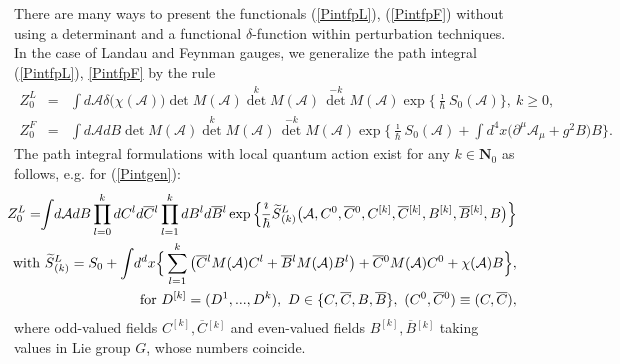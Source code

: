 \documentclass[10pt]{article}
\begin{document}
There are many ways to present the functionals  (\ref{PintfpL}), (\ref{PintfpF}) without using a determinant
and a functional $\delta$-function within perturbation techniques. In the case of Landau and Feynman gauges,
we generalize the path integral (\ref{PintfpL}), \ref{PintfpF}  by the rule
\begin{eqnarray}\label{Pintgen}
 Z^L_{0} & = & \int  d \mathcal{A} \delta\big(\chi(\mathcal{A})\big)\det M(\mathcal{A}) {\det}^{k} M(\mathcal{A}) \,  {\det}^{-k} M(\mathcal{A})\exp\Big\{\frac{\imath}{\hbar}S_0(\mathcal{A})\Big\} , \ k \geq 0,\\
 \label{PintgenF} Z^F_{0} & = &  \int  d \mathcal{A} d B \det M(\mathcal{A}) {\det}^{k} M(\mathcal{A}) \,  {\det}^{-k} M(\mathcal{A})\exp\Big\{\frac{\imath}{\hbar}S_0(\mathcal{A})+ \int d^4x  \big(\partial^\mu \mathcal{A}_\mu + {g^2}B\big)B\Big\}.
\end{eqnarray}
The path integral formulations with local quantum action exist for any $k \in \mathbf{N}_0$ as follows, e.g. for (\ref{Pintgen}):
\begin{eqnarray}\label{PintfpLlock}
 &\hspace{-1em}&\hspace{-0.5em} Z^L_{0} =  \hspace{-0.3em}\int \hspace{-0.2em} d \mathcal{A}dB\prod_{l=0}^{k} d C^{l} d \overline{C}{}^{l} \prod_{l=1}^k d B^{l} d \overline{B}{}^{l} \exp \Big\{\hspace{-0.1em}\frac{\imath}{\hbar}\widetilde{S}{}^L_{(k)}\big(\mathcal{A}, C^0,\overline{C}{}^0, C^{[k]}, \overline{C}{}^{[k]}, B^{[k]}, \overline{B}{}^{[k]}, B\big)\Big\} \\
   &\hspace{-1em}&\hspace{-0.5em}\ \mathrm{with}  \ \widetilde{S}{}^L_{(k)}  =  S_0+ \int \hspace{-0.2em}d^dx \Big\{\sum_{l=1}^k\big(\overline{C}{}^lM(\mathcal{A}){C}^l+\overline{B}{}^lM(\mathcal{A}){B}{}^{l}\big)+\overline{C}{}^0M(\mathcal{A}){C}^0+\chi( \mathcal{A})B\Big\}, \label{SintfpLlock}\\     &\hspace{-1em}&\hspace{-0.5em}\ \mathrm{for} \ D^{[k]}=(D^1,...,D^k), \ D\in\{C,\overline{C},B, \overline{B}\},  \ (C^0, \overline{C}{}^0) \equiv (C, \overline{C}{}),
\end{eqnarray}
where   odd-valued fields $C^{[k]}, \overline{C}{}^{[k]}$ and even-valued fields $B^{[k]}, \overline{B}{}^{[k]} $  taking values in Lie group $G$, whose numbers coincide.
\end{document}
